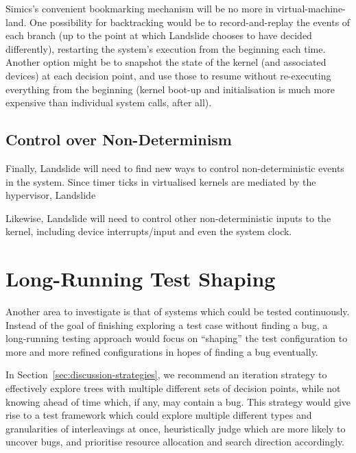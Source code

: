 Simics's convenient bookmarking mechanism will be no more in virtual-machine-land. One possibility for backtracking would be to record-and-replay the events of each branch (up to the point at which Landslide chooses to have decided differently), restarting the system's execution from the beginning each time. Another option might be to snapshot the state of the kernel (and associated devices) at each decision point, and use those to resume without re-executing everything from the beginning (kernel boot-up and initialisation is much more expensive than individual system calls, after all).

\subsection{Control over Non-Determinism}

Finally, Landslide will need to find new ways to control non-deterministic events in the system. Since timer ticks in virtualised kernels are mediated by the hypervisor, Landslide 

Likewise, Landslide will need to control other non-deterministic inputs to the kernel, including device interrupts/input and even the system clock.

\section{Long-Running Test Shaping}
\label{sec:future-shaping}

Another area to investigate is that of systems which could be tested continuously. Instead of the goal of finishing exploring a test case without finding a bug, a long-running testing approach would focus on ``shaping'' the test configuration to more and more refined configurations in hopes of finding a bug eventually.

In Section~\ref{sec:discussion-strategies}, we recommend an iteration strategy to effectively explore trees with multiple different sets of decision points, while not knowing ahead of time which, if any, may contain a bug.
This strategy would give rise to a test framework which could explore multiple different types and granularities of interleavings at once, heuristically judge which are more likely to uncover bugs, and prioritise resource allocation and search direction accordingly.


